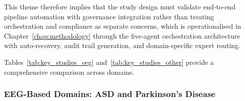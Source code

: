 \noindent This theme therefore implies that the study design must validate end-to-end pipeline automation with governance integration rather than treating orchestration and compliance as separate concerns, which is operationalised in Chapter~\ref{chap:methodology} through the five-agent orchestration architecture with auto-recovery, audit trail generation, and domain-specific expert routing.


\iffalse %
Tables~\ref{tab:key_studies_eeg} and~\ref{tab:key_studies_other} provide a comprehensive comparison across domains.

\subsubsection*{EEG-Based Domains: ASD and Parkinson's Disease}

